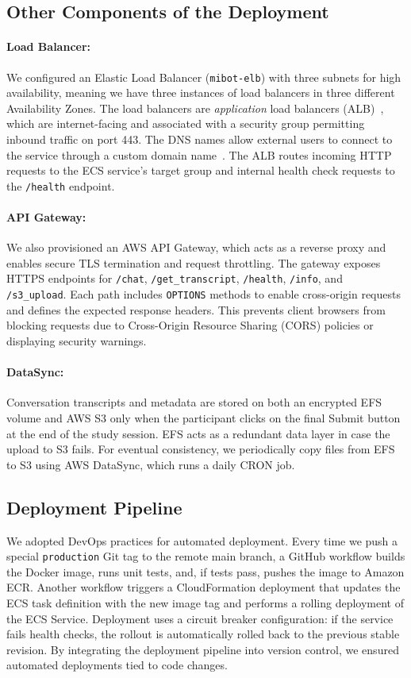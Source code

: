 \subsection{Other Components of the Deployment}

\paragraph{Load Balancer:}We configured an Elastic Load Balancer (\texttt{mibot-elb}) with three subnets for high availability, meaning we have three instances of load balancers in three different Availability Zones. The load balancers are \emph{application} load balancers (ALB)~\citep{aws_alb}, which are internet-facing and associated with a security group permitting inbound traffic on port 443. The DNS names allow external users to connect to the service through a custom domain name~\citep{shopify_domain_seo}. The ALB routes incoming HTTP requests to the ECS service's target group and internal health check requests to the \texttt{/health} endpoint.

\paragraph{API Gateway:}We also provisioned an AWS API Gateway, which acts as a reverse proxy and enables secure TLS termination and request throttling. The gateway exposes HTTPS endpoints for \texttt{/chat}, \texttt{/get\_transcript}, \texttt{/health}, \texttt{/info}, and \texttt{/s3\_upload}. Each path includes \texttt{OPTIONS} methods to enable cross-origin requests and defines the expected response headers. This prevents client browsers from blocking requests due to Cross-Origin Resource Sharing (CORS) policies or displaying security warnings.

\paragraph{DataSync:}Conversation transcripts and metadata are stored on both an encrypted EFS volume and AWS S3 only when the participant clicks on the final Submit button at the end of the study session. EFS acts as a redundant data layer in case the upload to S3 fails. For eventual consistency, we periodically copy files from EFS to S3 using AWS DataSync, which runs a daily CRON job.

\subsection{Deployment Pipeline}
We adopted DevOps practices for automated deployment. Every time we push a special \texttt{production} Git tag to the remote main branch, a GitHub workflow builds the Docker image, runs unit tests, and, if tests pass, pushes the image to Amazon ECR. Another workflow triggers a CloudFormation deployment that updates the ECS task definition with the new image tag and performs a rolling deployment of the ECS Service. Deployment uses a circuit breaker configuration: if the service fails health checks, the rollout is automatically rolled back to the previous stable revision. By integrating the deployment pipeline into version control, we ensured automated deployments tied to code changes.
